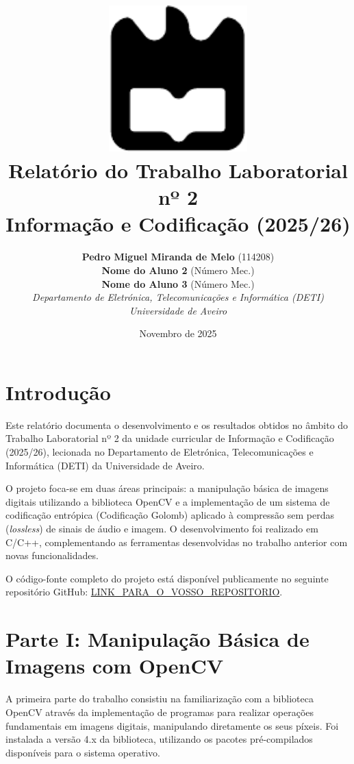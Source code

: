 \documentclass[a4paper, 11pt, portuguese]{article}
\title{
    \includegraphics[width=0.4\textwidth]{imagens/ua.pdf} \\ \vspace{1.5cm}
    \textbf{Relatório do Trabalho Laboratorial nº 2} \\
    \large Informação e Codificação (2025/26)
}
\author{
    \textbf{Pedro Miguel Miranda de Melo} (114208) \\
    \textbf{Nome do Aluno 2} (Número Mec.) \\
    \textbf{Nome do Aluno 3} (Número Mec.) \\
    \textit{Departamento de Eletrónica, Telecomunicações e Informática (DETI)} \\
    \textit{Universidade de Aveiro}
}
\date{Novembro de 2025}
\begin{document}
\maketitle
\thispagestyle{empty} %

\newpage
\tableofcontents %
\newpage

\section{Introdução}

Este relatório documenta o desenvolvimento e os resultados obtidos no âmbito do Trabalho Laboratorial nº 2 da unidade curricular de Informação e Codificação (2025/26), lecionada no Departamento de Eletrónica, Telecomunicações e Informática (DETI) da Universidade de Aveiro.

O projeto foca-se em duas áreas principais: a manipulação básica de imagens digitais utilizando a biblioteca OpenCV e a implementação de um sistema de codificação entrópica (Codificação Golomb) aplicado à compressão sem perdas (\textit{lossless}) de sinais de áudio e imagem. O desenvolvimento foi realizado em C/C++, complementando as ferramentas desenvolvidas no trabalho anterior com novas funcionalidades.

O código-fonte completo do projeto está disponível publicamente no seguinte repositório GitHub: \url{LINK_PARA_O_VOSSO_REPOSITORIO}. %

\section{Parte I: Manipulação Básica de Imagens com OpenCV}

A primeira parte do trabalho consistiu na familiarização com a biblioteca OpenCV através da implementação de programas para realizar operações fundamentais em imagens digitais, manipulando diretamente os seus píxeis. Foi instalada a versão 4.x da biblioteca, utilizando os pacotes pré-compilados disponíveis para o sistema operativo.
\end{document}
